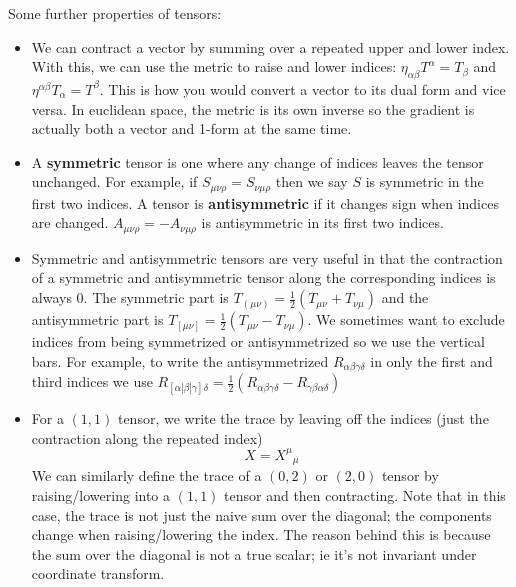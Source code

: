 \documentclass[11pt]{article}
\begin{document}
\noindent Some further properties of tensors:
\begin{itemize}
    
    \item We can contract a vector by summing over a repeated upper and lower index. With this, we can use the metric to raise and lower indices: \( \eta_{\alpha \beta} T^{\alpha} = T_{\beta} \)
    and \( \eta^{\alpha \beta}T_{\alpha} = T^{\beta} \). This is how you would convert a vector to its dual form and vice versa. In euclidean space, the metric is its own inverse so the gradient is actually both a vector and 1-form at the same time.

    \item A \textbf{symmetric} tensor is one where any change of indices leaves the tensor unchanged. For example, if \( S_{\mu \nu \rho} = S_{\nu \mu \rho} \) then we say \( S \) is symmetric in the first two indices. A tensor is \textbf{antisymmetric}
    if it changes sign when indices are changed. \( A_{\mu \nu \rho} = -A_{\nu \mu \rho} \) is antisymmetric in its first two indices.

    \item Symmetric and antisymmetric tensors are very useful in that the contraction of a symmetric and antisymmetric tensor along the corresponding indices is always 0. The symmetric part is \( T_{(\mu\nu)} = \frac{1}{2}(T_{\mu \nu} + T_{\nu \mu}) \) and
    the antisymmetric part is \( T_{[\mu \nu]} = \frac{1}{2}(T_{\mu \nu} - T_{\nu \mu}) \). We sometimes want to exclude indices from being symmetrized or antisymmetrized so we use the vertical bars. For example, to write the antisymmetrized \( R_{\alpha \beta \gamma \delta} \) 
    in only the first and third indices we use \( R_{[\alpha |\beta| \gamma] \delta} = \frac{1}{2}(R_{\alpha \beta \gamma \delta} - R_{\gamma \beta \alpha \delta})\)

    \item For a \( (1,1) \) tensor, we write the trace by leaving off the indices (just the contraction along the repeated index) 
    \[ 
        X = X^{\mu}{}_{\mu} 
    \]
    We can similarly define the trace of a \( (0,2) \) or \( (2,0) \) tensor by raising/lowering into a \( (1,1) \) tensor and then contracting. Note that in this case, the trace is not just the naive sum over the diagonal; the components change when raising/lowering
    the index. The reason behind this is because the sum over the diagonal is not a true scalar; ie it's not invariant under coordinate transform.

\end{itemize}
\end{document}
